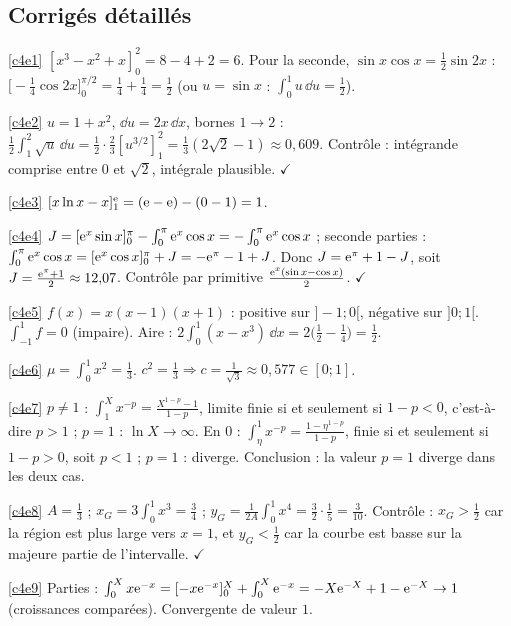 \subsection{Corrigés détaillés}
\begin{corrige}{\ref{c4e1}}
$[x^3-x^2+x]_0^2=8-4+2=6$. Pour la seconde, $\sin x\cos x=\frac12\sin2x$ : $\big[-\frac14\cos2x\big]_0^{\pi/2}=\frac14+\frac14=\frac12$ (ou $u=\sin x$ : $\int_0^1u\,\dd u=\frac12$).
\end{corrige}
\begin{corrige}{\ref{c4e2}}
$u=1+x^2$, $\dd u=2x\,\dd x$, bornes $1\to2$ : $\frac12\int_1^2\sqrt u\,\dd u=\frac12\cdot\frac23[u^{3/2}]_1^2=\frac13(2\sqrt2-1)\approx0{,}609$. Contrôle : intégrande comprise entre $0$ et $\sqrt2$, intégrale plausible. $\checkmark$
\end{corrige}
\begin{corrige}{\ref{c4e3}}
$[x\ln x-x]_1^{\mathrm{e}}=(\mathrm{e}-\mathrm{e})-(0-1)=1$.
\end{corrige}
\begin{corrige}{\ref{c4e4}}
$J=[\mathrm{e}^x\sin x]_0^\pi-\int_0^\pi\mathrm{e}^x\cos x=-\int_0^\pi\mathrm{e}^x\cos x$ ; seconde parties : $\int_0^\pi\mathrm{e}^x\cos x=[\mathrm{e}^x\cos x]_0^\pi+J=-\mathrm{e}^\pi-1+J$. Donc $J=\mathrm{e}^\pi+1-J$, soit $J=\frac{\mathrm{e}^\pi+1}2\approx12{,}07$. Contrôle par primitive $\frac{\mathrm{e}^x(\sin x-\cos x)}2$. $\checkmark$
\end{corrige}
\begin{corrige}{\ref{c4e5}}
$f(x)=x(x-1)(x+1)$ : positive sur $]-1;0[$, négative sur $]0;1[$. $\int_{-1}^1f=0$ (impaire). Aire : $2\int_0^1(x-x^3)\,\dd x=2\big(\frac12-\frac14\big)=\frac12$.
\end{corrige}
\begin{corrige}{\ref{c4e6}}
$\mu=\int_0^1x^2=\frac13$. $c^2=\frac13\Rightarrow c=\frac1{\sqrt3}\approx0{,}577\in[0;1]$.
\end{corrige}
\begin{corrige}{\ref{c4e7}}
$p\ne1$ : $\int_1^X x^{-p}=\frac{X^{1-p}-1}{1-p}$, limite finie si et seulement si $1-p<0$, c'est-à-dire $p>1$ ; $p=1$ : $\ln X\to\infty$. En $0$ : $\int_\eta^1x^{-p}=\frac{1-\eta^{1-p}}{1-p}$, finie si et seulement si $1-p>0$, soit $p<1$ ; $p=1$ : diverge. Conclusion : la valeur $p=1$ diverge dans les deux cas.
\end{corrige}
\begin{corrige}{\ref{c4e8}}
$A=\frac13$ ; $x_G=3\int_0^1x^3=\frac34$ ; $y_G=\frac{1}{2A}\int_0^1x^4=\frac32\cdot\frac15=\frac3{10}$. Contrôle : $x_G>\frac12$ car la région est plus large vers $x=1$, et $y_G<\frac12$ car la courbe est basse sur la majeure partie de l'intervalle. $\checkmark$
\end{corrige}
\begin{corrige}{\ref{c4e9}}
Parties : $\int_0^Xx\mathrm{e}^{-x}=[-x\mathrm{e}^{-x}]_0^X+\int_0^X\mathrm{e}^{-x}=-X\mathrm{e}^{-X}+1-\mathrm{e}^{-X}\to1$ (croissances comparées). Convergente de valeur $1$.
\end{corrige}
\else{}\fi

